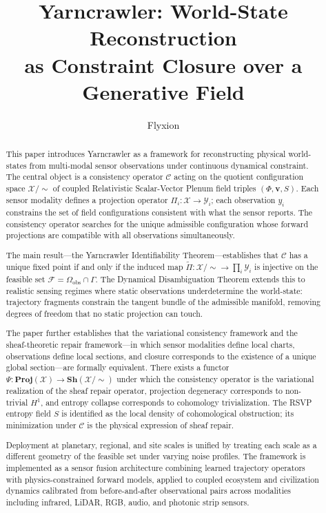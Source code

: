 \documentclass[12pt, oneside]{article}
\title{%
  \Large\textbf{Yarncrawler: World-State Reconstruction}\\[6pt]
  \large\textbf{as Constraint Closure over a Generative Field}
}
\author{Flyxion}
\date{}
\newcommand{\Xmod}{\mathcal{X}/{\sim}}
\begin{document}
\maketitle

\begin{abstract}
This paper introduces Yarncrawler as a framework for reconstructing physical world-states
from multi-modal sensor observations under continuous dynamical constraint. The central
object is a consistency operator $\mathcal{C}$ acting on the quotient configuration space
$\mathcal{X}/{\sim}$ of coupled Relativistic Scalar-Vector Plenum field triples
$(\Phi, \mathbf{v}, S)$. Each sensor modality defines a projection operator
$\Pi_i : \mathcal{X} \to \mathcal{Y}_i$; each observation $y_i$ constrains the set of
field configurations consistent with what the sensor reports. The consistency operator
searches for the unique admissible configuration whose forward projections are compatible
with all observations simultaneously.

The main result---the Yarncrawler Identifiability Theorem---establishes that $\mathcal{C}$
has a unique fixed point if and only if the induced map
$\widetilde{\Pi} : \Xmod \to \prod_i \mathcal{Y}_i$ is injective on the feasible set
$\mathcal{F} = \Omega_{\mathrm{obs}} \cap \Gamma$. The Dynamical Disambiguation Theorem
extends this to realistic sensing regimes where static observations underdetermine the
world-state: trajectory fragments constrain the tangent bundle of the admissible manifold,
removing degrees of freedom that no static projection can touch.

The paper further establishes that the variational consistency framework and the
sheaf-theoretic repair framework---in which sensor modalities define local charts, observations
define local sections, and closure corresponds to the existence of a unique global
section---are formally equivalent. There exists a functor
$\Psi : \mathbf{Proj}(\mathcal{X}) \to \mathbf{Sh}(\Xmod)$ under which the consistency
operator is the variational realization of the sheaf repair operator, projection degeneracy
corresponds to non-trivial $H^1$, and entropy collapse corresponds to cohomology
trivialization. The RSVP entropy field $S$ is identified as the local density of
cohomological obstruction; its minimization under $\mathcal{C}$ is the physical expression
of sheaf repair.

Deployment at planetary, regional, and site scales is unified by treating each scale as a
different geometry of the feasible set under varying noise profiles. The framework is
implemented as a sensor fusion architecture combining learned trajectory operators with
physics-constrained forward models, applied to coupled ecosystem and civilization dynamics
calibrated from before-and-after observational pairs across modalities including infrared,
LiDAR, RGB, audio, and photonic strip sensors.
\end{abstract}
\end{document}
